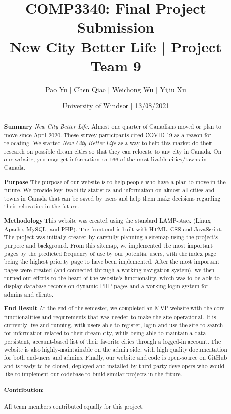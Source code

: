 \documentclass[12pt, letterpaper]{article}
\title{COMP3340: Final Project Submission \\{New City Better Life | Project Team 9}}
\author{Pao Yu | Chen Qiao | Weichong Wu | Yijiu Xu}
\date{University of Windsor | 13/08/2021}
\begin{document}
\maketitle

\begin{abstract}

    \textbf{Summary}
    \textit{New City Better Life.} Almost one quarter of Canadians moved or plan to move since April 2020. These survey participants cited COVID-19 as a reason for relocating. We started \textit{New City Better Life} as a way to help this market do their research on possible dream cities so that they can relocate to any city in Canada. On our website, you may get information on 166 of the most livable cities/towns in Canada.
    
    \textbf{Purpose}
    The purpose of our website is to help people who have a plan to move in the future. We provide key livability statistics and information on almost all cities and towns in Canada that can be saved by users and help them make decisions regarding their relocation in the future.
   
    \textbf{Methodology}
    This website was created using the standard LAMP-stack (Linux, Apache, MySQL, and PHP). The front-end is built with HTML, CSS and JavaScript. The project was initially created by carefully planning a sitemap using the project's purpose and background. From this sitemap, we implemented the most important pages by the predicted frequency of use by our potential users, with the index page being the highest priority page to have been implemented. After the most important pages were created (and connected through a working navigation system), we then turned our efforts to the heart of the website's functionality, which was to be able to display database records on dynamic PHP pages and a working login system for admins and clients.

    \textbf{End Result}
    At the end of the semester, we completed an MVP website with the core functionalities and requirements that was needed to make the site operational. It is currently live and running, with users able to register, login and use the site to search for information related to their dream city, while being able to maintain a data-persistent, account-based list of their favorite cities through a logged-in account. The website is also highly-maintainable on the admin side, with high quality documentation for both end-users and admins. Finally, our website and code is open-source on GitHub and is ready to be cloned, deployed and installed by third-party developers who would like to implement our codebase to build similar projects in the future.

\paragraph*{Contribution: } All team members contributed equally for this project.

\end{abstract}
\end{document}
